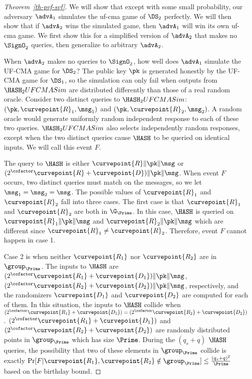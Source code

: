 \begin{proof}[Theorem~\ref{th-pvf-svf}]
	We will show that except with some small probability, our adversary $\advA_1$ simulates the uf-cma game of $\DS_2$ perfectly. We will then show that if $\advA_2$ wins the simulated game, then $\advA_1$ will win its own uf-cma game. We first show this for a simplified version of $\advA_2$ that makes no $\SignO_2$ queries, then generalize to arbitrary $\advA_2$. 
	
	When $\advA_2$ makes no queries to $\SignO_2$, how well does $\advA_1$ simulate the UF-CMA game for $\DS_2$? The public key $\pk$ is generated honestly by the UF-CMA game for $\DS_1$, so the simulation can only fail when outputs from $\HASH_2UFCMASim$ are distributed differently than those of a real random oracle. Consider two distinct queries to $\HASH_2UFCMASim$: $(\pk, \curvepoint{R}_1, \msg_1)$ and $(\pk, \curvepoint{R}_2, \msg_2)$. A random oracle would generate uniformly random independent response to each of these two queries. $\HASH_2UFCMASim$ also selects independently random responses, except when the two distinct queries cause $\HASH$ to be queried on identical inputs. We will call this event $F$. 
	
	The query to $\HASH$ is either $\curvepoint{R}\|\pk\|\msg$ or $(2^\cofactor\curvepoint{R} + \curvepoint{D})\|\pk\|\msg$. When event $F$ occurs, two distinct queries must match on the messages, so we let $\msg_1 = \msg_2 = \msg$. The possible values of $\curvepoint{R}_1$ and $\curvepoint{R}_2$ fall into three cases. The first case is that $\curvepoint{R}_1$ and $\curvepoint{R}_2$ are both in $\G_\Prime$. In this case, $\HASH$ is queried on $\curvepoint{R}_1\|\pk\|\msg$ and $\curvepoint{R}_2\|\pk\|\msg$ which are different since $\curvepoint{R}_1 \neq \curvepoint{R}_2$. Therefore, event $F$ cannot happen in case 1. 
	
	Case 2 is when neither $\curvepoint{R_1}$ nor $\curvepoint{R_2}$ are  in $\group_{\Prime}$. The inputs to $\HASH$ are $(2^\cofactor\curvepoint{R_1} + \curvepoint{D_1})\|\pk\|\msg$, 
	$(2^\cofactor\curvepoint{R_2} + \curvepoint{D_2})\|\pk\|\msg$, respectively, and the randomizers $\curvepoint{D_1}$ and $\curvepoint{D_2}$ are computed for each of them. In this situation, the inputs to $\HASH$ collide when $(2^\cofactor\curvepoint{R_1} + \curvepoint{D_1}) = (2^\cofactor\curvepoint{R_2} + \curvepoint{D_2})$. $(2^\cofactor\curvepoint{R_1} + \curvepoint{D_1})$ and $(2^\cofactor\curvepoint{R_2} + \curvepoint{D_2})$ are randomly distributed points in $\group_{\Prime}$ which has size $\Prime$. During the $(q_s + q)$ $\HASH$ queries, the possibility that two of these elements in $\group_{\Prime}$ collide is exactly $\Pr[F | \curvepoint{R_1}, \curvepoint{R_2} \notin \group_{\Prime}] \leq \frac{(q_s + q)^2}{\Prime}$ based on the birthday bound.
	

\end{proof}
